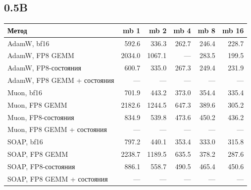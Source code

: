 \documentclass[10pt]{article}
\begin{document}
\subsection{0.5B}
\begin{center}
\small
\begin{tabular}{lrrrrr}
\toprule
\textbf{Метод} & \textbf{mb 1} & \textbf{mb 2} & \textbf{mb 4} & \textbf{mb 8} & \textbf{mb 16} \\
\midrule
AdamW, bf16 & 592.6 & 336.3 & 262.7 & 246.4 & 228.7 \\
AdamW, FP8 GEMM & 2034.0 & 1067.1 & --- & 283.5 & 199.5 \\
AdamW, FP8-состояния & 600.7 & 335.0 & 267.3 & 249.4 & 231.9 \\
AdamW, FP8 GEMM + состояния & --- & --- & --- & --- & --- \\
Muon, bf16 & 701.9 & 443.2 & 373.0 & 354.4 & 335.4 \\
Muon, FP8 GEMM & 2182.6 & 1244.5 & 647.3 & 389.6 & 305.2 \\
Muon, FP8-состояния & 834.9 & 539.8 & 473.6 & 450.2 & 436.2 \\
Muon, FP8 GEMM + состояния & --- & --- & --- & --- & --- \\
SOAP, bf16 & 797.2 & 440.1 & 353.4 & 333.0 & 315.8 \\
SOAP, FP8 GEMM & 2238.7 & 1189.5 & 635.5 & 378.2 & 287.6 \\
SOAP, FP8-состояния & 886.1 & 558.7 & 490.5 & 465.4 & 450.6 \\
SOAP, FP8 GEMM + состояния & --- & --- & --- & --- & --- \\
\bottomrule
\end{tabular}
\end{center}
\end{document}
